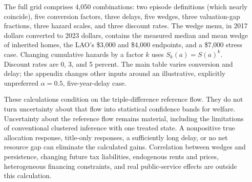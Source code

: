 

The full grid comprises 4,050 combinations: two episode definitions (which
nearly coincide),
five conversion factors, three delays, five wedges, three valuation-gap
fractions, three hazard scales, and three discount rates. The wedge menu, in 2017 dollars converted to 2023 dollars, contains the
measured median and mean wedge of inherited homes, the LAO's \$3,000 and
\$4,000 endpoints, and a \$7,000 stress case. Changing cumulative hazards by a factor $k$ uses $S_k(a)=S(a)^k$.
Discount rates are 0, 3, and 5 percent. The main table varies conversion and
delay; the appendix changes other inputs around an illustrative, explicitly
unpreferred $\alpha=0.5$, five-year-delay case.

These calculations condition on the triple-difference reference flow. They do not
turn uncertainty about that flow into statistical confidence bands for
welfare. Uncertainty about the reference flow remains material, including
the limitations of conventional clustered inference with one treated state. A nonpositive true allocation response, title-only
responses, a sufficiently long delay, or no net resource gap can eliminate
the calculated gains. Correlation between wedges and persistence, changing
future tax liabilities, endogenous rents and prices, heterogeneous financing
constraints, and real public-service effects are outside this calculation.
